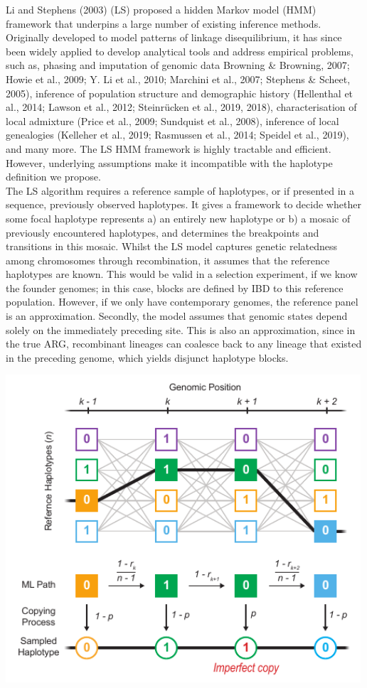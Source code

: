 \documentclass[twocolumn]{bmcart}%
\begin{document}
\begin{tcolorbox}[colback=blue!5!white,colframe=blue!50!black,title= Box 3: Application and limits of Li and Stephens Model ]
\footnotesize{Li and Stephens (2003) (LS) proposed a hidden Markov model (HMM) framework that underpins a large number of existing inference methods. Originally developed to model patterns of linkage disequilibrium, it has since been widely applied to develop analytical tools and address empirical problems, such as, phasing and imputation of genomic data  Browning \& Browning, 2007; Howie et al., 2009; Y. Li et al., 2010; Marchini et al., 2007; Stephens \& Scheet, 2005), inference of population structure and demographic history (Hellenthal et al., 2014; Lawson et al., 2012; Steinrücken et al., 2019, 2018), characterisation of local admixture (Price et al., 2009; Sundquist et al., 2008), inference of local genealogies (Kelleher et al., 2019; Rasmussen et al., 2014; Speidel et al., 2019), and many more. The LS HMM framework is highly tractable and efficient. However, underlying assumptions make it incompatible with the haplotype definition we propose.\\
The LS algorithm requires a reference sample of haplotypes, or if presented in a sequence, previously observed haplotypes. It gives a framework to decide whether some focal haplotype represents a) an entirely new haplotype or b) a mosaic of previously encountered haplotypes, and determines the breakpoints and transitions in this mosaic. Whilst the LS model captures genetic relatedness among chromosomes through recombination, it assumes that the reference haplotypes are known. This would be valid in a selection experiment, if we know the founder genomes; in this case, blocks are defined by IBD to this reference population. However, if we only have contemporary genomes, the reference panel is an approximation. Secondly, the model assumes that genomic states depend solely on the immediately preceding site. This is also an approximation, since in the true ARG, recombinant lineages can coalesce back to any lineage that existed in the preceding genome, which yields disjunct haplotype blocks.}
    \begin{center}
\includegraphics[width=0.99\textwidth]{Fig_B2.pdf}

\end{center}
\end{tcolorbox}
\end{document}
